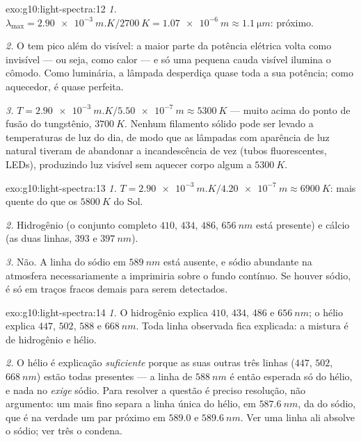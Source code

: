 \begin{solution}{exo:g10:light-spectra:12}
\emph{1.} $\lambda_{\max} = \qty{2.90e-3}{m.K} / \qty{2700}{K}
= \qty{1.07e-6}{m} \approx \qty{1.1}{\micro m}$:  próximo.

\emph{2.} O  tem pico além do visível: a maior parte da potência
elétrica volta como  invisível --- ou seja, como calor --- e só
uma pequena cauda visível ilumina o cômodo. Como luminária, a lâmpada
desperdiça quase toda a sua potência; como aquecedor, é quase perfeita.

\emph{3.} $T = \qty{2.90e-3}{m.K} / \qty{5.50e-7}{m} \approx
\qty{5300}{K}$ --- muito acima do ponto de fusão do tungstênio,
$\qty{3700}{K}$. Nenhum filamento sólido pode ser levado a temperaturas de
luz do dia, de modo que as lâmpadas com aparência de luz natural tiveram de
abandonar a incandescência de vez (tubos fluorescentes, LEDs), produzindo
luz visível sem aquecer corpo algum a $\qty{5300}{K}$.
\end{solution}

\begin{solution}{exo:g10:light-spectra:13}
\emph{1.} $T = \qty{2.90e-3}{m.K} / \qty{4.20e-7}{m} \approx
\qty{6900}{K}$: mais quente do que os $\qty{5800}{K}$ do Sol.

\emph{2.} Hidrogênio (o conjunto completo $410$, $434$, $486$,
$\qty{656}{nm}$ está presente) e cálcio (as duas linhas, $393$ e
$\qty{397}{nm}$).

\emph{3.} Não. A linha do sódio em $\qty{589}{nm}$ está ausente, e sódio
abundante na atmosfera necessariamente a imprimiria sobre o fundo contínuo.
Se houver sódio, é só em traços fracos demais para serem detectados.
\end{solution}

\begin{solution}{exo:g10:light-spectra:14}
\emph{1.} O hidrogênio explica $410$, $434$, $486$ e $\qty{656}{nm}$; o
hélio explica $447$, $502$, $588$ e $\qty{668}{nm}$. Toda linha observada
fica explicada: a mistura é de hidrogênio e hélio.

\emph{2.} O hélio é explicação \emph{suficiente} porque as suas outras três
linhas ($447$, $502$, $\qty{668}{nm}$) estão todas presentes --- a linha de
$\qty{588}{nm}$ é então esperada só do hélio, e nada no 
\emph{exige} sódio. Para resolver a questão é preciso resolução, não
argumento: um  mais fino separa a linha única do hélio, em
$\qty{587.6}{nm}$, da do sódio, que é na verdade um par próximo em $589.0$ e
$\qty{589.6}{nm}$. Ver uma linha ali absolve o sódio; ver três o condena.
\end{solution}

